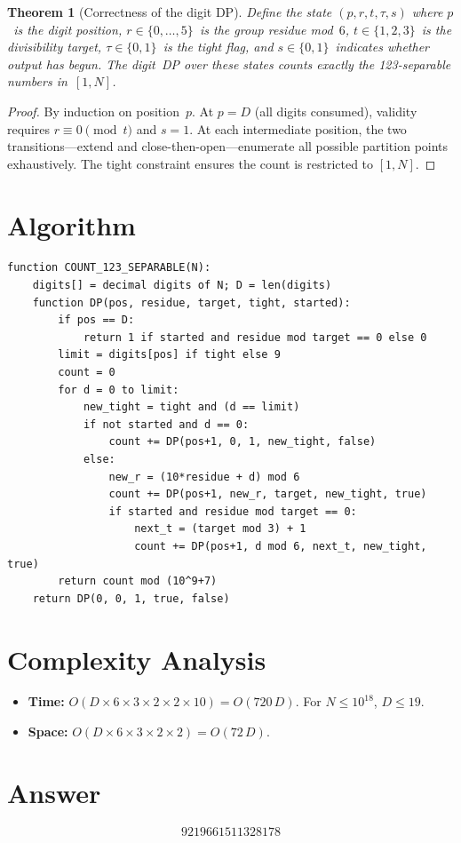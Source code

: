 \documentclass[11pt]{article}
\newtheorem{theorem}{Theorem}
\theoremstyle{definition}
\begin{document}
\begin{theorem}[Correctness of the digit DP]
Define the state $(p, r, t, \tau, s)$ where $p$~is the digit position, $r \in \{0,\ldots,5\}$~is the group residue mod~$6$, $t \in \{1,2,3\}$~is the divisibility target, $\tau \in \{0,1\}$~is the tight flag, and $s \in \{0,1\}$~indicates whether output has begun. The digit~DP over these states counts exactly the 123-separable numbers in~$[1,N]$.
\end{theorem}

\begin{proof}
By induction on position~$p$. At $p = D$ (all digits consumed), validity requires $r \equiv 0 \pmod{t}$ and $s = 1$. At each intermediate position, the two transitions---extend and close-then-open---enumerate all possible partition points exhaustively. The tight constraint ensures the count is restricted to $[1,N]$.
\end{proof}

\section{Algorithm}

\begin{verbatim}
function COUNT_123_SEPARABLE(N):
    digits[] = decimal digits of N; D = len(digits)
    function DP(pos, residue, target, tight, started):
        if pos == D:
            return 1 if started and residue mod target == 0 else 0
        limit = digits[pos] if tight else 9
        count = 0
        for d = 0 to limit:
            new_tight = tight and (d == limit)
            if not started and d == 0:
                count += DP(pos+1, 0, 1, new_tight, false)
            else:
                new_r = (10*residue + d) mod 6
                count += DP(pos+1, new_r, target, new_tight, true)
                if started and residue mod target == 0:
                    next_t = (target mod 3) + 1
                    count += DP(pos+1, d mod 6, next_t, new_tight, true)
        return count mod (10^9+7)
    return DP(0, 0, 1, true, false)
\end{verbatim}

\section{Complexity Analysis}

\begin{itemize}
    \item \textbf{Time:} $O(D \times 6 \times 3 \times 2 \times 2 \times 10) = O(720\,D)$. For $N \le 10^{18}$, $D \le 19$.
    \item \textbf{Space:} $O(D \times 6 \times 3 \times 2 \times 2) = O(72\,D)$.
\end{itemize}

\section{Answer}

\[
\boxed{9219661511328178}
\]
\end{document}
